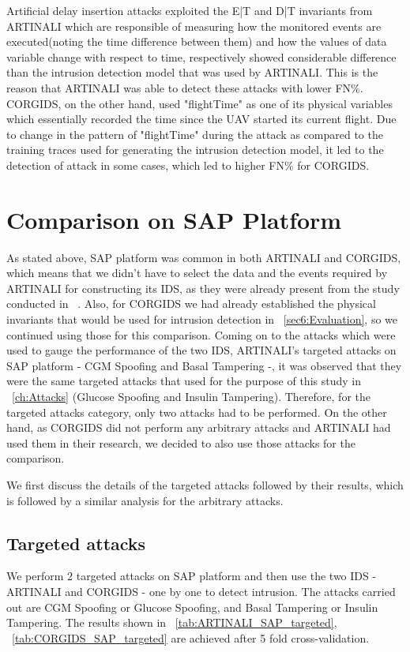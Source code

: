 Artificial delay insertion attacks exploited the E|T and D|T invariants from ARTINALI which are responsible of measuring how the monitored events are executed(noting the time difference between them) and how the values of data variable change with respect to time, respectively showed considerable difference than the intrusion detection model that was used by ARTINALI. This is the reason that ARTINALI was able to detect these attacks with lower FN\%. CORGIDS, on the other hand, used "flightTime" as one of its physical variables which essentially recorded the time since the UAV started its current flight. Due to change in the pattern of "flightTime" during the attack as compared to the training traces used for generating the intrusion detection model, it led to the detection of attack in some cases, which led to higher FN\% for CORGIDS.


\section{Comparison on SAP Platform}
As stated above, SAP platform was common in both ARTINALI and CORGIDS, which means that we didn't have to select the data and the events required by ARTINALI for constructing its IDS, as they were already present from the study conducted in ~\cite{aliabadi2017artinali}. Also, for CORGIDS we had already established the physical invariants that would be used for intrusion detection in ~\autoref{sec6:Evaluation}, so we continued using those for this comparison. Coming on to the attacks which were used to gauge the performance of the two IDS, ARTINALI's targeted attacks on SAP platform - CGM Spoofing and Basal Tampering -, it was observed that they were the same targeted attacks that used for the purpose of this study in ~\autoref{ch:Attacks} (Glucose Spoofing and Insulin Tampering). Therefore, for the targeted attacks category, only two attacks had to be performed. On the other hand, as CORGIDS did not perform any arbitrary attacks and ARTINALI had used them in their research, we decided to also use those attacks for the comparison.

We first discuss the details of the targeted attacks followed by their results, which is followed by a similar analysis for the arbitrary attacks.

\subsection{Targeted attacks}
We perform 2 targeted attacks on SAP platform and then use the two IDS - ARTINALI and CORGIDS - one by one to detect intrusion. The attacks carried out are CGM Spoofing or Glucose Spoofing, and Basal Tampering or Insulin Tampering. The results shown in ~\autoref{tab:ARTINALI_SAP_targeted}, ~\autoref{tab:CORGIDS_SAP_targeted} are achieved after 5 fold cross-validation.

